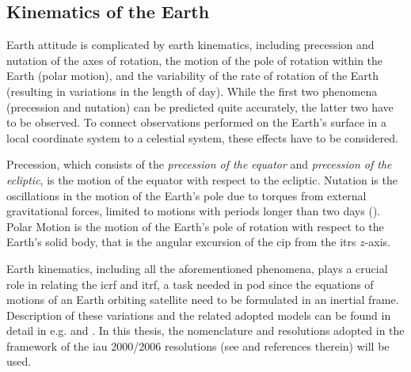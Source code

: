 \subsection{Kinematics of the Earth}\label{ssec:earth-attitude}

Earth attitude is complicated by earth kinematics, including precession and nutation 
of the axes of rotation, the motion of the pole of rotation within the Earth (polar 
motion), and the variability of the rate of rotation of the Earth (resulting in variations 
in the length of day). While the first two phenomena (precession and nutation) can be 
predicted quite accurately, the latter two have to be observed. To connect observations 
performed on the Earth's surface in a local coordinate system to a celestial system, 
these effects have to be considered.

Precession, which consists of the \emph{precession of the equator} and 
\emph{precession of the ecliptic}, is the motion of the equator with respect to 
the ecliptic. Nutation is the oscillations in the motion of the Earth's pole due 
to torques from external gravitational forces, limited to motions with periods longer 
than two days (\cite{Gurfil18}). Polar Motion is the motion of the Earth's pole of 
rotation with respect to the Earth's solid body, that is the angular excursion of 
the \gls{cip} from the \gls{itrs} $z$-axis.

Earth kinematics, including all the aforementioned phenomena, plays a crucial role in 
relating the \gls{icrf} and \gls{itrf}, a task needed in \gls{pod} since the equations 
of motions of an Earth orbiting satellite need to be formulated in an inertial frame.
Description of these variations and the related adopted models can be found in detail 
in e.g. \cite{Gurfil18} and \cite{Urban2013}. In this thesis, the nomenclature and 
resolutions adopted in the framework of the \gls{iau} 2000/2006 resolutions 
(see \cite{iers2010} and references therein) will be used.
